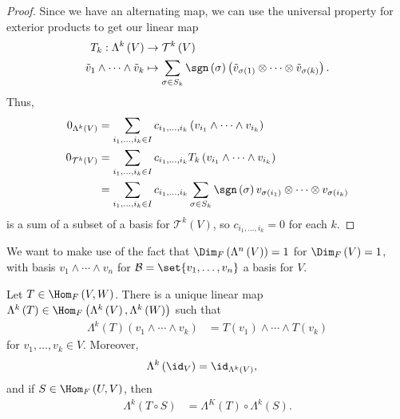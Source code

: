 \documentclass[10pt]{mypackage}
\begin{document}
\begin{proof}
      Since we have an alternating map, we can use the universal property for exterior products to get our linear map
      \begin{align*}
        T_{k}:\Lambda^{k}\left(V\right)&\rightarrow \mathcal{T}^{k}\left(V\right)\\
        \tilde{v}_{1}\wedge\cdots\wedge\tilde{v}_{k} &\mapsto \sum_{\sigma\in S_k}\sgn\left(\sigma\right)\left(\tilde{v}_{\sigma(1)}\otimes\cdots\otimes \tilde{v}_{\sigma(k)}\right).
      \end{align*}
      Thus, 
      \begin{align*}
        0_{\Lambda^{k}\left(V\right)} &= \sum_{i_1,\dots,i_k \in I}c_{i_1,\dots,i_k}\left(v_{i_1}\wedge\cdots\wedge v_{i_k}\right)\\
        0_{\mathcal{T}^{k}\left(V\right)} &= \sum_{i_1,\dots,i_k\in I}c_{i_1,\dots,i_k}T_k\left(v_{i_1}\wedge\cdots\wedge v_{i_k}\right)\\
                                          &= \sum_{i_1,\dots,i_k\in I}c_{i_1,\dots,i_k}\sum_{\sigma\in S_k}\sgn\left(\sigma\right)v_{\sigma\left(i_1\right)}\otimes\cdots\otimes v_{\sigma\left(i_k\right)}
      \end{align*}
      is a sum of a subset of a basis for $\mathcal{T}^{k}\left(V\right)$, so $c_{i_1,\dots,i_k} = 0$ for each $k$.
    \end{proof}
    We want to make use of the fact that $\Dim_{F}\left(\Lambda^{n}\left(V\right)\right) = 1$ for $\Dim_{F}\left(V\right) = 1$, with basis $v_1\wedge\cdots\wedge v_n$ for $\mathcal{B} = \set{v_1,\dots,v_n}$ a basis for $V$.
    \begin{proposition}
      Let $T\in \Hom_{F}\left(V,W\right)$. There is a unique linear map $\Lambda^{k}\left(T\right) \in \Hom_{F}\left(\Lambda^{k}\left(V\right),\Lambda^{k}\left(W\right)\right)$ such that
      \begin{align*}
        \Lambda^{k}\left(T\right)\left(v_1\wedge\cdots\wedge v_k\right) &= T\left(v_1\right)\wedge\cdots\wedge T\left(v_k\right)
      \end{align*}
      for $v_1,\dots,v_k\in V$. Moreover,
      \begin{align*}
        \Lambda^{k}\left(\id_{V}\right) &= \id_{\Lambda^{k}\left(V\right)},
      \end{align*}
      and if $S\in \Hom_{F}\left(U,V\right)$, then
      \begin{align*}
        \Lambda^{k}\left(T\circ S\right) &= \Lambda^{K}\left(T\right)\circ \Lambda^{k}\left(S\right).
      \end{align*}
    \end{proposition}
\end{document}
